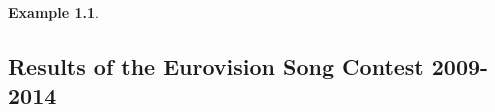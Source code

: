 \documentclass[a4paper,11pt]{report}
\newtheorem{example}[theorem]{Example}
\begin{document}
\begin{example}
\begin{appendices}





\begin{landscape}
  \chapter{Results of the Eurovision Song Contest 2009-2014}
  

\end{landscape}
\end{appendices}
\end{example}
\end{document}
